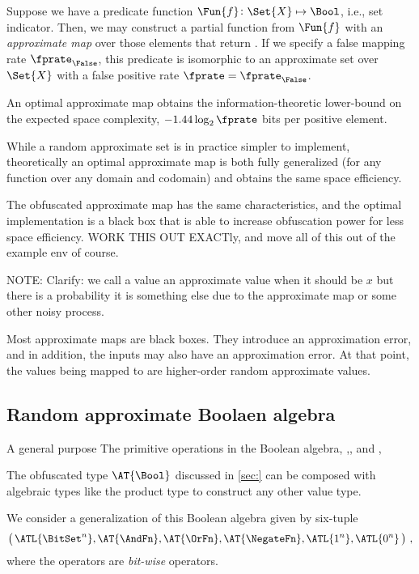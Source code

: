 \documentclass[ ../main.tex]{subfiles}
\begin{document}
\begin{example}
	Suppose we have a predicate function $\Fun{f} \colon \Set{X} \mapsto \Bool$, i.e., set indicator.
	Then, we may construct a partial function from $\Fun{f}$ with an \emph{approximate map} over those elements that return \True.
	If we specify a false mapping rate $\fprate_{\False}$, this predicate is isomorphic to an approximate set over $\Set{X}$ with a false positive rate $\fprate = \fprate_{\False}$.
	
	An optimal approximate map obtains the information-theoretic lower-bound on the expected space complexity, $-1.44 \log_2 \fprate$ bits per positive element.
	
	While a random approximate set is in practice simpler to implement, theoretically an optimal approximate map is both fully generalized (for any function over any domain and codomain) and obtains the same space efficiency.
	
	The obfuscated approximate map has the same characteristics, and the optimal implementation is a black box that is able to increase obfuscation power for less space efficiency.
	WORK THIS OUT EXACTly, and move all of this out of the example env of course.
\end{example}

\begin{remark}
NOTE: Clarify: we call a value an approximate value when it should be $x$ but there is a probability it is something else due to the approximate map or some other noisy process.
\end{remark}

Most approximate maps are black boxes.
They introduce an approximation error, and in addition, the inputs may also have an approximation error. At that point, the values being mapped to are higher-order random approximate values.
	
\subsection{Random approximate Boolaen algebra}
A general purpose The primitive operations in the Boolean algebra, \AndFn,\OrFn, and \NegateFn, 

The obfuscated type $\AT{\Bool}$ discussed in \cref{sec:} can be composed with algebraic types like the product type to construct any other value type.

We consider a generalization of this Boolean algebra given by six-tuple
\begin{equation}
	\left(\,\ATL{\BitSet^n},\AT{\AndFn},\AT{\OrFn},\AT{\NegateFn},\ATL{1^n},\ATL{0^n}\,\right)\,,
\end{equation}
where the operators are \emph{bit-wise} operators.
\end{document}
